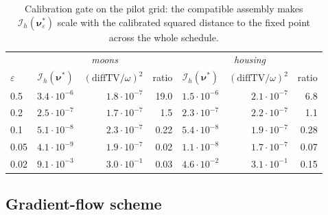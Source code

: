 \documentclass[11pt,leqno]{amsart}
\newcommand{\cI}{\mathcal{I}}
\newcommand{\bnu}{\boldsymbol{\nu}}
\newcommand{\eps}{\varepsilon}
\numberwithin{equation}{section}
\theoremstyle{definition}
\begin{document}
\begin{table}[ht]
\centering\small
\begin{tabular}{l rrr @{\qquad} rrr}
\toprule
& \multicolumn{3}{c}{\emph{moons}} & \multicolumn{3}{c}{\emph{housing}}\\
$\eps$ & $\cI_h(\bnu^*)$ & $(\mathrm{diffTV}/\omega)^2$ & ratio
       & $\cI_h(\bnu^*)$ & $(\mathrm{diffTV}/\omega)^2$ & ratio\\
\midrule
0.5  & $3.4\!\cdot\!10^{-6}$ & $1.8\!\cdot\!10^{-7}$ & 19.0 & $1.5\!\cdot\!10^{-6}$ & $2.1\!\cdot\!10^{-7}$ & 6.8\\
0.2  & $2.5\!\cdot\!10^{-7}$ & $1.7\!\cdot\!10^{-7}$ & 1.5  & $2.3\!\cdot\!10^{-7}$ & $2.2\!\cdot\!10^{-7}$ & 1.1\\
0.1  & $5.1\!\cdot\!10^{-8}$ & $2.3\!\cdot\!10^{-7}$ & 0.22 & $5.4\!\cdot\!10^{-8}$ & $1.9\!\cdot\!10^{-7}$ & 0.28\\
0.05 & $4.1\!\cdot\!10^{-9}$ & $1.9\!\cdot\!10^{-7}$ & 0.02 & $1.1\!\cdot\!10^{-8}$ & $1.7\!\cdot\!10^{-7}$ & 0.07\\
0.02 & $9.1\!\cdot\!10^{-3}$ & $3.0\!\cdot\!10^{-1}$ & 0.03 & $4.6\!\cdot\!10^{-2}$ & $3.1\!\cdot\!10^{-1}$ & 0.15\\
\bottomrule
\end{tabular}
\vskip 2pt
\caption{Calibration gate on the pilot grid: the compatible assembly makes
$\cI_h(\bnu^*_\eps)$ scale with the calibrated squared distance to the fixed
point across the whole schedule.}
\label{tab:fisher-consistency}
\end{table}

\subsection{Gradient-flow scheme}
\label{sec:method-flow}
\end{document}

